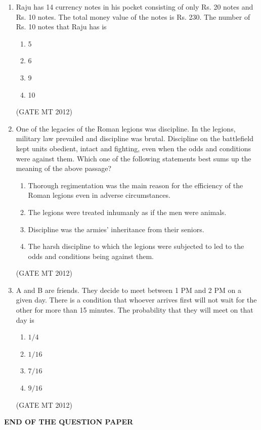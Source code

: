 \documentclass[journal, 11pt, onecolumn]{IEEEtran}
\theoremstyle{remark}
\begin{document}
\begin{enumerate}
\item Raju has 14 currency notes in his pocket consisting of only Rs. 20 notes and Rs. 10 notes. The total money value of the notes is Rs. 230. The number of Rs. 10 notes that Raju has is
\begin{multicols}{2}
\begin{enumerate}  
\item 5
\item 6
\item 9
\item 10
\end{enumerate}
\end{multicols}
\hfill(GATE MT 2012)

\item One of the legacies of the Roman legions was discipline. In the legions, military law prevailed and discipline was brutal. Discipline on the battlefield kept units obedient, intact and fighting, even when the odds and conditions were against them.
Which one of the following statements best sums up the meaning of the above passage?
\begin{multicols}{2}
\begin{enumerate}  
\item Thorough regimentation was the main reason for the efficiency of the Roman legions even in adverse circumstances.
\item The legions were treated inhumanly as if the men were animals.
\item Discipline was the armies' inheritance from their seniors.
\item The harsh discipline to which the legions were subjected to led to the odds and conditions being against them.
\end{enumerate}
\end{multicols}
\hfill(GATE MT 2012)

\item A and B are friends. They decide to meet between 1 PM and 2 PM on a given day. There is a condition that whoever arrives first will not wait for the other for more than 15 minutes. The probability that they will meet on that day is
\begin{multicols}{2}
\begin{enumerate}  
\item $1/4$
\item $1/16$
\item $7/16$
\item $9/16$
\end{enumerate}
\end{multicols}
\hfill(GATE MT 2012)

\end{enumerate}



\begin{center}
\textbf{END OF THE QUESTION PAPER}
\end{center}
\end{document}

